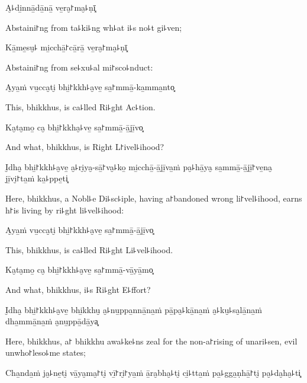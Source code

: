 A̮꜕di̱nnā̱dā̱nā̱ ve̱ra̮꜓ma̮꜕ṇī͓

\begin{english}
  Abstaini꜓ng from ta꜕ki꜕ng wh꜕at i꜕s no꜕t gi꜕ven;
\end{english}

Kā̱me̱su̮꜕ mi̱cchā̱꜓cā̱rā̱ ve̱ra̮꜓ma̮꜕ṇī͓

\begin{english}
  Abstaini꜓ng from se꜕xu꜕al mi꜓sco꜕nduct:
\end{english}

A̮ya̱ṁ vu̱cca̮ti̮ bhi̱꜓kkh꜕a̮ve̱ sa̱꜓mmā̱-ka̱mma̱nto͓

\begin{english}
  This, bhikkhus, is ca꜕lled Ri꜕ght Ac꜕tion.
\end{english}

Ka̮ta̮mo̱ ca̮ bhi̱꜓kkha̮꜕ve̱ sa̱꜓mmā̱-ā̱jī̱vo͓

\begin{english}
  And what, bhikkhus, is Right L꜓ivel꜕ihood?
\end{english}

I̮dha̮ bhi̱꜓kkh꜕a̮ve̱ a̮꜕ri̮ya̮-sā̱꜓va̮꜕ko̱ mi̱cchā̱-ā̱jī̱va̱ṁ pa̮꜕hā̱ya̮ sa̱mmā̱-ā̱jī̱꜓ve̱na̮ jī̱vi̮꜓ta̱ṁ ka̱꜕ppe̱ti͓

\begin{english}
  Here, bhikkhus, a Nobl꜕e Di꜕sc꜕iple, having a꜓bandoned wrong li꜓vel꜕ihood, earns h꜓is living by ri꜕ght li꜕vel꜕ihood:
\end{english}

A̮ya̱ṁ vu̱cca̮ti̮ bhi̱꜓kkh꜕a̮ve̱ sa̱꜓mmā̱-ā̱jī̱vo͓

\begin{english}
  This, bhikkhus, is ca꜕lled Ri꜕ght Li꜕vel꜕ihood.
\end{english}

Ka̮ta̮mo̱ ca̮ bhi̱꜓kkh꜕a̮ve̱ sa̱꜓mmā̱-vā̱yā̱mo͓

\begin{english}
  And what, bhikkhus, i꜕s Ri꜕ght E꜕ffort?
\end{english}

I̮dha̮ bhi̱꜓kkh꜕a̮ve̱ bhi̱kkhu̮ a̮꜕nu̱ppa̱nnā̱na̱ṁ pā̱pa̮꜕kā̱na̱ṁ a̮꜕ku̮꜕sa̮lā̱na̱ṁ dha̱mmā̱na̱ṁ a̮nu̱ppā̱dā̱ya͓

\begin{english}
  Here, bhikkhus, a꜓ bhikkhu awa꜕ke꜕ns zeal for the non-a꜓rising of unari꜕sen, evil unwho꜓leso꜕me states;
\end{english}

Cha̱nda̱ṁ ja̮꜕ne̱ti̮ vā̱ya̮ma̮꜓ti̮ vī̱꜓ri̮꜓ya̱ṁ ā̱ra̮bha̮꜕ti̮ ci̱꜕tta̱ṁ pa̱꜕gga̱ṇhā̱꜓ti̮ pa̮꜕da̮ha̮꜕ti͓

